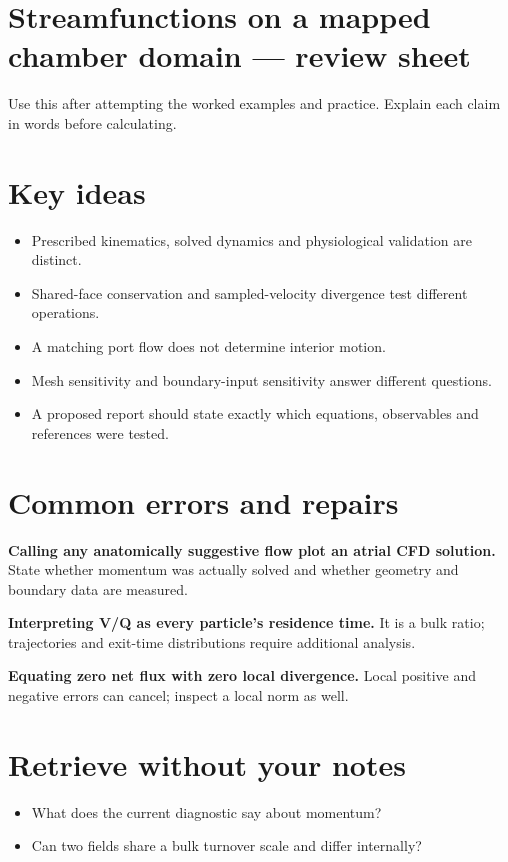 \documentclass[11pt,letterpaper]{article}
\theoremstyle{definition}\newtheorem{definition}{Definition}\newtheorem{example}{Example}
\numberwithin{equation}{section}
\begin{document}
\section*{Streamfunctions on a mapped chamber domain --- review sheet}
Use this after attempting the worked examples and practice. Explain each claim in words before calculating.

\section*{Key ideas}
\begin{itemize}
\item Prescribed kinematics, solved dynamics and physiological validation are distinct.
\item Shared-face conservation and sampled-velocity divergence test different operations.
\item A matching port flow does not determine interior motion.
\item Mesh sensitivity and boundary-input sensitivity answer different questions.
\item A proposed report should state exactly which equations, observables and references were tested.
\end{itemize}
\section*{Common errors and repairs}
\textbf{Calling any anatomically suggestive flow plot an atrial CFD solution.} State whether momentum was actually solved and whether geometry and boundary data are measured.

\textbf{Interpreting V/Q as every particle's residence time.} It is a bulk ratio; trajectories and exit-time distributions require additional analysis.

\textbf{Equating zero net flux with zero local divergence.} Local positive and negative errors can cancel; inspect a local norm as well.

\section*{Retrieve without your notes}
\begin{itemize}
\item What does the current diagnostic say about momentum?
\item Can two fields share a bulk turnover scale and differ internally?
\end{itemize}
\end{document}
